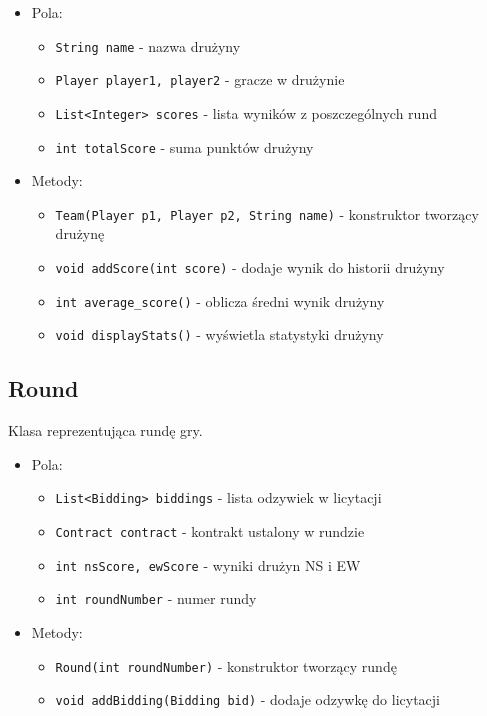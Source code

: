 \documentclass{article}
\begin{document}
\begin{itemize}
    \item Pola:
    \begin{itemize}
        \item \texttt{String name} - nazwa drużyny
        \item \texttt{Player player1, player2} - gracze w drużynie
        \item \texttt{List<Integer> scores} - lista wyników z poszczególnych rund
        \item \texttt{int totalScore} - suma punktów drużyny
    \end{itemize}
    
    \item Metody:
    \begin{itemize}
        \item \texttt{Team(Player p1, Player p2, String name)} - konstruktor tworzący drużynę
        \item \texttt{void addScore(int score)} - dodaje wynik do historii drużyny
        \item \texttt{int average\_score()} - oblicza średni wynik drużyny
        \item \texttt{void displayStats()} - wyświetla statystyki drużyny
    \end{itemize}
\end{itemize}

\subsection{Round}
Klasa reprezentująca rundę gry.

\begin{itemize}
    \item Pola:
    \begin{itemize}
        \item \texttt{List<Bidding> biddings} - lista odzywiek w licytacji
        \item \texttt{Contract contract} - kontrakt ustalony w rundzie
        \item \texttt{int nsScore, ewScore} - wyniki drużyn NS i EW
        \item \texttt{int roundNumber} - numer rundy
    \end{itemize}
    
    \item Metody:
    \begin{itemize}
        \item \texttt{Round(int roundNumber)} - konstruktor tworzący rundę
        \item \texttt{void addBidding(Bidding bid)} - dodaje odzywkę do licytacji
    \end{itemize}
\end{itemize}
\end{document}
